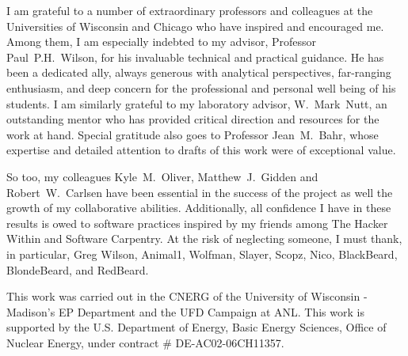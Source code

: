 I am grateful to a number of extraordinary professors and colleagues at the 
Universities of Wisconsin and Chicago who have inspired and encouraged me.  
Among them, I am especially indebted to my advisor, Professor Paul~P.H.~Wilson, 
for his invaluable technical and practical guidance. He has been a dedicated 
ally, always generous with analytical perspectives, far-ranging enthusiasm, and 
deep concern for the professional and personal well being of his students. I 
am similarly grateful to my laboratory advisor, W.~Mark~Nutt, an outstanding 
mentor who has provided critical direction and resources for the work at 
hand. Special gratitude also goes to Professor Jean~M.~Bahr, whose expertise 
and detailed attention to drafts of this work were of exceptional value.  

So too, my colleagues Kyle~M.~Oliver, Matthew~J.~Gidden and Robert~W.~Carlsen 
have been essential in the success of the \Cyclus project as well the growth of 
my collaborative abilities.  Additionally, all confidence I have in these 
results is owed to software practices inspired by my friends among The Hacker 
Within and Software Carpentry. At the risk of neglecting someone, I must thank, 
in particular, Greg Wilson, Animal1, Wolfman, Slayer, Scopz, Nico,  BlackBeard, 
BlondeBeard, and RedBeard.

This work was carried out in the \gls{CNERG} of the University of Wisconsin - 
Madison's \gls{EP} Department and the \gls{UFD} Campaign at \gls{ANL}. This 
work is supported by the U.S. Department of Energy, Basic Energy Sciences, 
Office of Nuclear Energy, under contract \# DE-AC02-06CH11357.
